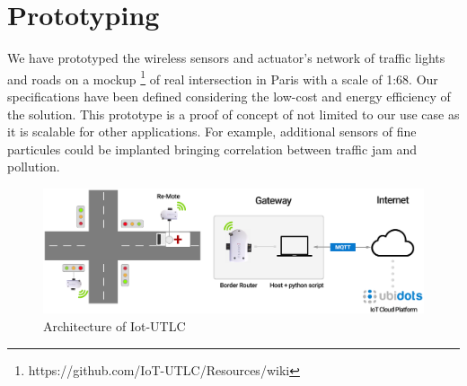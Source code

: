 \documentclass[conference]{../../setup/IEEEtran}
\begin{document}

\section{Prototyping} \label{sec:Prototyping}

We have prototyped the wireless sensors and actuator's network of traffic lights and roads on a mockup \footnote{https://github.com/IoT-UTLC/Resources/wiki} of real intersection in Paris with a scale of 1:68. Our specifications have been defined considering the low-cost and energy efficiency of the solution. This prototype is a proof of concept of not limited to our use case as it is scalable for other applications. For example, additional sensors of fine particules could be implanted bringing correlation between traffic jam and pollution. 
\begin{figure}[!htb]
\centering
\includegraphics[width=4.5in]{Figures/ScenarioPaper.eps}
\caption{Architecture of  Iot-UTLC}
\label{fig:ScenarioPaper.eps}
\end{figure}

\end{document}
